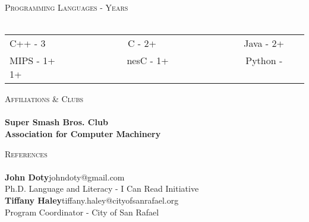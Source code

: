 \documentclass[a4paper]{article}
\newcommand{\lineunder} {
    \vspace*{-8pt} \\
    \hspace*{-18pt} \hrulefill \\
}
\newcommand{\header} [1] {
    {\hspace*{-18pt}\vspace*{6pt} \textsc{#1}}
    \vspace*{-6pt} \lineunder
}
\begin{document}
\header{Programming Languages - Years}
\begin{tabular}{ l l }
	C++ - 3 $\>$ $\>$ $\>$ $\>$ $\>$ $\>$ $\>$ $\>$ $\>$ $\>$ $\>$ $\>$ $\>$ $\>$ $\>$ C - 2+ $\>$ $\>$ $\>$ $\>$ $\>$ $\>$ $\>$ $\>$ $\>$ $\>$ $\>$ $\>$ $\>$ $\>$ $\>$ $\>$ Java - 2+ \\
	MIPS - 1+ $\>$ $\>$ $\>$ $\>$ $\>$ $\>$ $\>$ $\>$  $\>$ $\>$ $\>$ $\>$ $\>$ nesC - 1+ $\>$ $\>$ $\>$ $\>$ $\>$ $\>$ $\>$ $\>$ $\>$ $\>$ $\>$ $\>$ $\>$ $\>$ Python - 1+ \\
\end{tabular}
\vspace{3mm}

\header{Affiliations \& Clubs}

\vspace*{2mm}
\textbf{Super Smash Bros. Club}\\

\vspace*{2mm}
\textbf{Association for Computer Machinery}\\

\vspace*{2mm}

\header{References}
\textbf{John Doty}\hfill johndoty@gmail.com\\
Ph.D. Language and Literacy - I Can Read Initiative\\
\vspace{3mm}
\textbf{Tiffany Haley}\hfill tiffany.haley@cityofsanrafael.org\\
Program Coordinator - City of San Rafael\\
\vspace{3mm}
\end{document}

